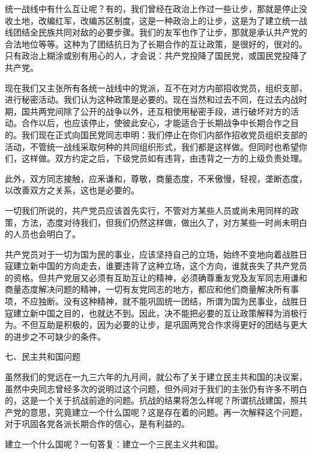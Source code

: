 统一战线中有什么互让呢？有的，我们曾经在政治上作过一些让步，那就是停止没收土地，改编红军，改编苏区制度，这是一种政治上的让步，这是为了建立统一战线团结全民族共同对敌的必要步骤。我们的友军也作了让步，那就是承认共产党的合法地位等等。这种为了团结抗日为了长期合作的互让政策，是很好的，很对的。只有政治上糊涂或别有用心的人，才会说：共产党投降了国民党，或国民党投降了共产党。

现在我们又主张所有各统一战线中的党派，互不在对方内部招收党员，组织支部，进行秘密活动。我们认为这种政策是必要的。现在当然和过去不同，在过去内战时期，国共两党间除了公开的战争以外，还互相使用秘密手段，进行破坏对方的活动。合作以后，也应该停止，使彼此安心，才能适合于长期战争中长期合作之目的。我们现在正式向国民党同志申明：我们停止在你们内部作招收党员组织支部的活动，不管统一战线采取何种的共同组织形式，我们都是这样做。但同时也希望你们，这样做。双方约定之后，下级党员如有违背，由违背之一方的上级负责处理。


此外，双方同志接触，应釆谦和，尊敬，商量态度，不釆傲慢，轻视，垄断态度，以改善双方之关系，这也是必要的。

一切我们所说的，共产党员应该首先实行，不管对方某些人员或尚未用同样的政策，方法，态度对待我们，但我们仍然这样做，做出久了，对方某些一时尚未明白的人员也会明白了。

共产党员对于一切为国为民的事业，应该坚持自己的立场，始终不变地向着战胜日寇建立新中国的方向走去，谁要违背了这种立场，这个方向，谁就丧失了共产党员的资格。但共产党层又必须有互助互让的精神，必须确尊重友党及友军同志用谦和商量态度解决问题的精神，一切有友党同志的地方，都应和他们商量解决所有事项，不应独断。没有这种精神，就不能巩固统一团结，所谓为国为民事业，战胜日寇建立新中国之目的，也就达不到。因此，决不能把必要的互让政策解释为消极行为。不但互助是积极的，因为必要的让步，是巩固两党合作求得更好的团结与更大的进步之不可缺少的条件。

七、民主共和国问题

虽然我们的党远在一九三六年的九月间，就公布了关于建立民主共和国的决议案，虽然中央同志曾经多次的说明过这个问题，但外间对于我们的主张仍有许多不明白的，这是一个关于抗战前途的问题。抗战的结果将怎么样呢？所谓抗战建国，照共产党的意思，究竟建立一个什么国呢？这是存在着的问题。再一次解释这个问题，对于巩固各党各派长期合作的信心，是有利益的。

建立一个什么国呢？一句答复：建立一个三民主义共和国。

